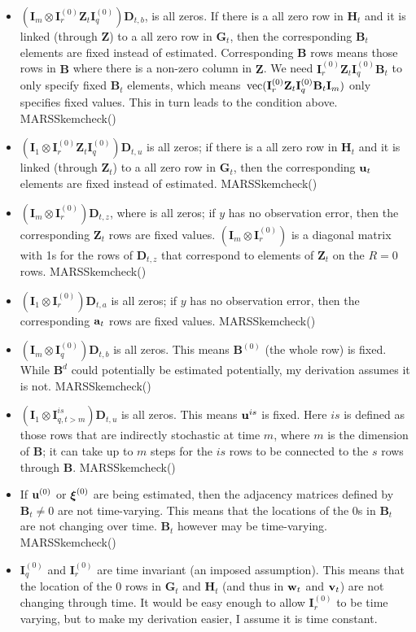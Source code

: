 \documentclass[]{article}
\def\xixi{\mbox{\boldmath $\xi$}}
\def\UPS{\mbox{\boldmath $\Upsilon$}}
\def\XI{\mbox{\boldmath $\Xi$}}
\def\BB{\mbox{$\mathbf B$}}	\def\bb{\mbox{$\mathbf b$}} \def\Bb{\mbox{$\mathbf J$}} \def\Ba{\mbox{$\mathbf L$}} \def\Bm{\UPS}
\def\DD{\mbox{$\mathbf D$}}	\def\dd{\mbox{$\mathbf d$}}
\def\GG{\mbox{$\mathbf G$}}	\def\gg{\mbox{$\mathbf g$}}
\def\HH{\mbox{$\mathbf H$}}	\def\hh{\mbox{$\mathbf h$}}
\def\II{\mbox{$\mathbf I$}} \def\ii{\mbox{$\mathbf i$}}
\def\ZZ{\mbox{$\mathbf Z$}}	\def\zz{\mbox{$\mathbf z$}}	\def\Zb{\mbox{$\mathbf M$}} \def\Za{\mbox{$\mathbf N$}} \def\Zm{\XI}
\def\vec{\,\textup{\textrm{vec}}}
\begin{document}
\begin{itemize}
\item $(\II_m \otimes \II_r^{(0)}\ZZ_t\II_q^{(0)})\DD_{t,b}$,  is  all zeros. If there is a all zero row in $\HH_t$ and it is linked (through $\ZZ$) to a all zero row in $\GG_t$, then the corresponding $\BB_t$ elements are fixed instead of estimated.  Corresponding $\BB$ rows means those rows in $\BB$ where there is a non-zero column in $\ZZ$.  We need $\II_r^{(0)}\ZZ_t\II_q^{(0)}\BB_t$ to only specify fixed $\BB_t$ elements, which means $\vec(\II_r^{(0)}\ZZ_t\II_q^{(0)}\BB_t\II_m)$ only specifies fixed values.  This in turn leads to the condition above. MARSSkemcheck()
\item $(\II_1 \otimes \II_r^{(0)}\ZZ_t\II_q^{(0)})\DD_{t,u}$ is all zeros;  if there is a all zero row in $\HH_t$ and it is linked (through $\ZZ_t$) to a all zero row in $\GG_t$, then the corresponding $\uu_t$ elements are fixed instead of estimated.  MARSSkemcheck()
\item $(\II_m \otimes \II_r^{(0)})\DD_{t,z}$, where  is  all zeros; if $y$ has no observation error, then the corresponding $\ZZ_t$ rows are fixed values. $(\II_m \otimes \II_r^{(0)})$ is a diagonal matrix with 1s for the rows of $\DD_{t,z}$ that correspond to elements of $\ZZ_t$ on the $R=0$ rows. MARSSkemcheck()
\item $(\II_1 \otimes \II_r^{(0)})\DD_{t,a}$ is all zeros; if $y$ has no observation error, then the corresponding $\aa_t$ rows are fixed values. MARSSkemcheck()
\item $(\II_m \otimes \II_q^{(0)})\DD_{t,b}$ is all zeros.  This means $\BB^{(0)}$ (the whole row) is fixed.  While $\BB^d$ could potentially be estimated potentially, my derivation assumes it is not. MARSSkemcheck()
\item $(\II_1 \otimes \II_{q,t>m}^{is})\DD_{t,u}$ is all zeros.  This means $\uu^{is}$ is fixed.  Here $is$ is defined as those rows that are indirectly stochastic at time $m$, where $m$ is the dimension of $\BB$; it can take up to $m$ steps for the $is$ rows to be connected to the $s$ rows through $\BB$. MARSSkemcheck()
\item If $\uu^{(0)}$ or $\xixi^{(0)}$ are being estimated, then the adjacency matrices defined by $\BB_t \neq 0$ are not time-varying. This means that the locations of the 0s in $\BB_t$ are not changing over time. $\BB_t$ however may be time-varying. MARSSkemcheck()
\item $\II_q^{(0)}$ and $\II_r^{(0)}$ are time invariant (an imposed assumption).  This means that the location of the 0 rows in $\GG_t$ and $\HH_t$ (and thus in $\ww_t$ and $\vv_t$) are not changing through time.  It would be easy enough to allow $\II_r^{(0)}$ to be time varying, but to make my derivation easier, I assume it is time constant.

\end{itemize}
\end{document}
